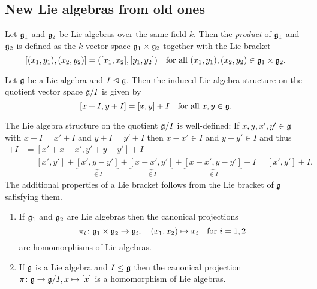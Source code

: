 \subsection{New Lie algebras from old ones}


\begin{defi}
 Let $\mathfrak{g}_1$ and $\mathfrak{g}_2$ be Lie algebras over the same field $k$. Then the \emph{product} of $\mathfrak{g}_1$ and $\mathfrak{g}_2$ is defined as the $k$-vector space $\mathfrak{g}_1 \times \mathfrak{g}_2$ together with the Lie bracket
 \[
  [(x_1, y_1), (x_2, y_2)]
  = ([x_1, x_2], [y_1, y_2])
  \quad
  \text{for all $(x_1, y_1), (x_2, y_2) \in \mathfrak{g}_1 \times \mathfrak{g}_2$}.
 \]
\end{defi}


\begin{defi}
 Let $\mathfrak{g}$ be a Lie algebra and $I \trianglelefteq \mathfrak{g}$. Then the induced Lie algebra structure on the quotient vector space $\mathfrak{g}/I$ is given by
 \[
  [x+I, y+I] = [x,y] + I \quad \text{for all $x,y \in \mathfrak{g}$}.
 \]
\end{defi}


\begin{rem}
 The Lie algebra structure on the quotient $\mathfrak{g}/I$ is well-defined: If $x,y, x',y' \in \mathfrak{g}$ with $x+I = x'+I$ and $y+I = y'+I$ then $x-x' \in I$ and $y-y' \in I$ and thus
 \begin{align*}
  [x,y] + I
  &= [x' + x-x', y' + y-y'] + I \\
  &= [x',y'] + \underbrace{[x', y-y']}_{\in I} + \underbrace{[x-x', y']}_{\in I} + \underbrace{[x-x', y-y']}_{\in I} + I
  = [x', y'] + I.
 \end{align*}
 The additional properties of a Lie bracket follows from the Lie bracket of $\mathfrak{g}$ safisfying them.
\end{rem}


\begin{lem}
 \begin{enumerate}[leftmargin=*]
  \item
   If $\mathfrak{g}_1$ and $\mathfrak{g}_2$ are Lie algebras then the canonical projections
   \[
    \pi_i \colon \mathfrak{g}_1 \times \mathfrak{g}_2 \to \mathfrak{g}_i, \quad (x_1, x_2) \mapsto x_i
    \quad \text{for $i = 1, 2$}
   \]
   are homomorphisms of Lie-algebras.
  \item
   If $\mathfrak{g}$ is a Lie algebra and $I \trianglelefteq \mathfrak{g}$ then the canonical projection $\pi \colon \mathfrak{g} \to \mathfrak{g}/I, x \mapsto [x]$ is a homomorphism of Lie algebras.
 \end{enumerate}
\end{lem}



